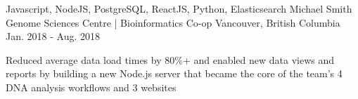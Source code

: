 \begin{cventries}
  \cventry
    {Javascript, NodeJS, PostgreSQL, ReactJS, Python, Elasticsearch} %
    {Michael Smith Genome Sciences Centre | Bioinformatics Co-op} %
    {Vancouver, British Columbia} %
    {Jan. 2018 - Aug. 2018} %
    {
      \begin{cvitems} %
        \item {Reduced average data load times by 80\%+ and enabled new data views and reports by building a new Node.js server that became the core of the team’s 4 DNA analysis workflows and 3 websites}
      \end{cvitems}
    }

\end{cventries}
